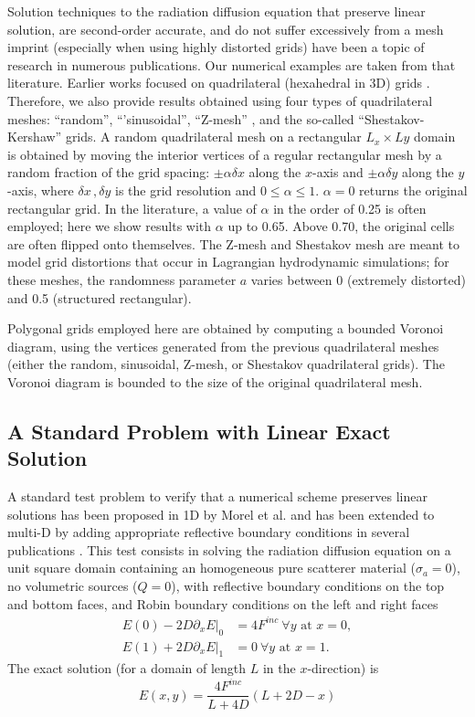 \documentclass[preprint,10pt]{elsarticle}
\begin{document}
Solution techniques to the radiation diffusion equation that preserve linear solution, are 
second-order accurate, and do not suffer excessively from a mesh imprint (especially when using highly
distorted grids) have been a topic of research in numerous publications. Our numerical examples
are taken from that literature. Earlier works focused on quadrilateral (hexahedral in 3D) grids
\cite{aaa}. Therefore, we also provide results obtained using four types of quadrilateral meshes: 
``random'', ``'sinusoidal'', ``Z-mesh'' \cite{kershaw too?}, and the so-called ``Shestakov-Kershaw'' grids.
A random quadrilateral mesh on a rectangular $L_x \times Ly$ domain is obtained by moving the interior 
vertices of a regular rectangular mesh by a random fraction of the grid spacing: $\pm\alpha\delta x$ along 
the $x$-axis and $\pm\alpha\delta y$ along the $y$-axis, where $\delta x\,,\delta y$ is the grid resolution 
and $0 \le \alpha \le 1$. $\alpha=0$ returns the original rectangular grid. In the literature, a value of
$\alpha$ in the order of 0.25 is often employed; here we show results with $\alpha$ up to 0.65. 
Above 0.70, the original cells are often flipped onto themselves. The Z-mesh and Shestakov 
mesh are meant to model grid distortions that occur in Lagrangian hydrodynamic simulations; for these meshes,
the randomness parameter $a$ varies between 0 (extremely distorted) and 0.5 (structured rectangular).

Polygonal grids employed here are obtained by computing a bounded Voronoi diagram, using the 
vertices generated from the previous quadrilateral meshes (either the random, sinusoidal, Z-mesh, 
or Shestakov quadrilateral grids). The Voronoi diagram is bounded to the size of the original 
quadrilateral mesh.


\subsection{A Standard Problem with Linear Exact Solution}
A standard test problem to verify that a numerical scheme preserves linear solutions has been
proposed in 1D by Morel et al. \cite{morel} and has been extended to multi-D by adding 
appropriate reflective boundary conditions in several publications \cite{}. This test consists
in solving the radiation diffusion equation on a unit square domain containing an homogeneous pure 
scatterer material ($\sigma_a=0$), no volumetric sources ($Q=0$), with reflective boundary conditions 
on the top and bottom faces, and Robin boundary conditions on the left and right faces
\begin{align}
  E(0) - 2 D \left.\partial_x E\right|_0 &= 4F^{inc} \ \forall y \textrm{ at } x=0, \\
  E(1) + 2 D \left.\partial_x E\right|_1 &= 0 \ \forall y \textrm{ at } x=1.
\end{align}
The exact solution (for a domain of length $L$ in the $x$-direction) is
\begin{equation}
E(x,y) = 	\frac{4F^{inc}}{L+4D}\left(L+2D-x \right)
\end{equation}
\end{document}
